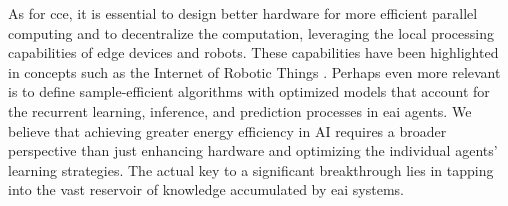 \documentclass[12pt]{article}
\begin{document}
As for \ac{cce}, it is essential to design better hardware for more efficient parallel computing and to decentralize the computation, leveraging the local processing capabilities of edge devices and robots. These capabilities have been highlighted in concepts such as the Internet of Robotic Things \cite{Vermesan2020InternetRoboticThings,Sekala2024SelectedIssuesMethods}. Perhaps even more relevant is to define sample-efficient algorithms with optimized models that account for the recurrent learning, inference, and prediction processes in \ac{eai} agents. We believe that achieving greater energy efficiency in AI requires a broader perspective than just enhancing hardware and optimizing the individual agents' learning strategies. The actual key to a significant breakthrough lies in tapping into the vast reservoir of knowledge accumulated by \ac{eai} systems.
\end{document}
